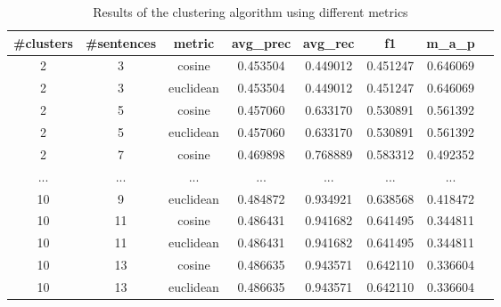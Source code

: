 \begin{table}[H]
  \centering
  \caption{Results of the clustering algorithm using different metrics}
  \label{tab:my-table}
  \begin{adjustbox}{margin={-1cm 0cm 0cm 0cm}}
    \begin{tabular}{|c|c|c|c|c|c|c|c|}
      \hline
      \textbf{\#clusters} & \textbf{\#sentences} & \textbf{metric} & \textbf{avg\_prec} & \textbf{avg\_rec} & \textbf{f1} & \textbf{m\_a\_p} \\ \hline
      2                  & 3                    & cosine          & 0.453504           & 0.449012          & 0.451247    & 0.646069         \\ \hline
      2                  & 3                    & euclidean       & 0.453504           & 0.449012          & 0.451247    & 0.646069         \\ \hline
      2                  & 5                    & cosine          & 0.457060           & 0.633170          & 0.530891    & 0.561392         \\ \hline
      2                  & 5                    & euclidean       & 0.457060           & 0.633170          & 0.530891    & 0.561392         \\ \hline
      2                  & 7                    & cosine          & 0.469898           & 0.768889          & 0.583312    & 0.492352         \\ \hline
      ...                & ...                  & ...             & ...                & ...               & ...         & ...              \\ \hline
      10                 & 9                    & euclidean       & 0.484872           & 0.934921          & 0.638568    & 0.418472         \\ \hline
      10                 & 11                   & cosine          & 0.486431           & 0.941682
                         & 0.641495             & 0.344811                                                                                  \\ \hline
      10                 & 11                   & euclidean       & 0.486431           & 0.941682          & 0.641495    & 0.344811         \\ \hline
      10                 & 13                   & cosine          & 0.486635           & 0.943571          & 0.642110    & 0.336604         \\ \hline
      10                 & 13                   & euclidean       & 0.486635           & 0.943571          & 0.642110    & 0.336604         \\ \hline
    \end{tabular}
  \end{adjustbox}
\end{table}

